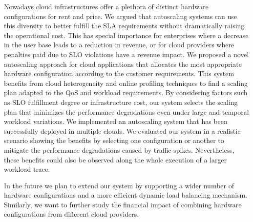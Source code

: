 
Nowadays cloud infrastructures offer a plethora of distinct hardware configurations for rent and price. We argued that autoscaling systems can use this diversity to better fulfill the SLA requirements without dramatically raising the operational cost. This has special importance for enterprises where a decrease in the user base leads to a reduction in revenue, or for cloud providers where penalties paid due to SLO violations have a revenue impact. We proposed a novel autoscaling approach for cloud applications that allocates the most appropriate hardware configuration according to the customer requirements. This system benefits from cloud heterogeneity and online profiling techniques to find a scaling plan adapted to the QoS and workload requirements. By considering factors such as SLO fulfillment degree or infrastructure cost, our system selects the scaling plan that minimizes the performance degradations even under large and temporal workload variations. We implemented an autoscaling system that has been successfully deployed in multiple clouds. We evaluated our system in a realistic scenario showing the benefits by selecting one configuration or another to mitigate the performance degradations caused by traffic spikes. Nevertheless, these benefits could also be observed along the whole execution of a larger workload trace. 

In the future we plan to extend our system by supporting a wider number of hardware configurations and a more efficient dynamic load balancing mechanism. Similarly, we want to further study the financial impact of combining hardware configurations from different cloud providers.








